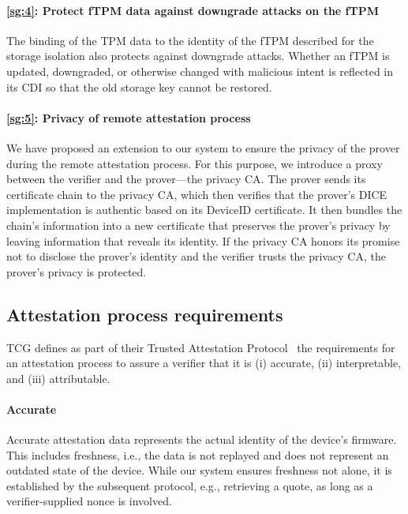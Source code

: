 \paragraph{\ref{sg:4}: Protect fTPM data against downgrade attacks on the fTPM}
The binding of the TPM data to the identity of the fTPM described for the storage isolation also protects against downgrade attacks.
Whether an fTPM is updated, downgraded, or otherwise changed with malicious intent is reflected in its CDI so that the old storage key cannot be restored.

\paragraph{\ref{sg:5}: Privacy of remote attestation process}
We have proposed an extension to our system to ensure the privacy of the prover during the remote attestation process.
For this purpose, we introduce a proxy between the verifier and the prover---the privacy CA\@.
The prover sends its certificate chain to the privacy CA, which then verifies that the prover's DICE implementation is authentic based on its DeviceID certificate.
It then bundles the chain's information into a new certificate that preserves the prover's privacy by leaving information that reveals its identity.
If the privacy CA honors its promise not to disclose the prover's identity and the verifier trusts the privacy CA, the prover's privacy is protected.

\subsection{Attestation process requirements}


\Ac{TCG} defines as part of their Trusted Attestation Protocol~\cite{tap} the requirements for an attestation process to assure a verifier that it is (i) accurate, (ii) interpretable, and (iii) attributable.

\paragraph{Accurate}
Accurate attestation data represents the actual identity of the device's firmware.
This includes freshness, i.e., the data is not replayed and does not represent an outdated state of the device.
While our system ensures freshness not alone, it is established by the subsequent protocol, e.g., retrieving a quote, as long as a verifier-supplied nonce is involved.

